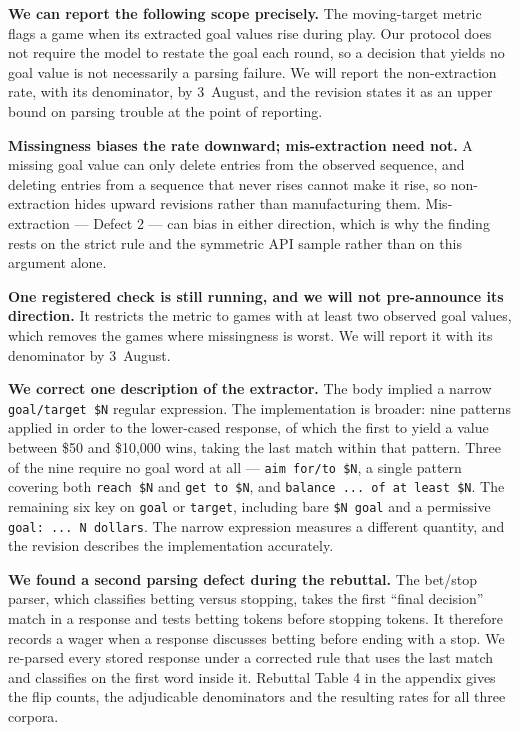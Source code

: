 \textbf{We can report the following scope precisely.} The moving-target metric flags a game when
its extracted goal values rise during play. Our protocol does not require the model to restate
the goal each round, so a decision that yields no goal value is not necessarily a parsing
failure. We will report the non-extraction rate, with its denominator, by 3~August, and the
revision states it as an upper bound on parsing trouble at the point of reporting.

\textbf{Missingness biases the rate downward; mis-extraction need not.} A missing goal value can
only delete entries from the observed sequence, and deleting entries from a sequence that never
rises cannot make it rise, so non-extraction hides upward revisions rather than manufacturing
them. Mis-extraction --- Defect 2 --- can bias in either direction, which is why the finding
rests on the strict rule and the symmetric API sample rather than on this argument alone.

\textbf{One registered check is still running, and we will not pre-announce its direction.} It
restricts the metric to games with at least two observed goal values, which removes the games
where missingness is worst. We will report it with its denominator by 3~August.

\textbf{We correct one description of the extractor.} The body implied a narrow
\texttt{goal/target \$N} regular expression. The implementation is broader: nine patterns applied
in order to the lower-cased response, of which the first to yield a value between \$50 and
\$10,000 wins, taking the last match within that pattern. Three of the nine require no goal word
at all --- \texttt{aim for/to \$N}, a single pattern covering both \texttt{reach \$N} and
\texttt{get to \$N}, and \texttt{balance ... of at least \$N}. The remaining six key on
\texttt{goal} or \texttt{target}, including bare \texttt{\$N goal} and a permissive
\texttt{goal: ... N dollars}.
The narrow expression measures a different quantity, and the revision describes the implementation
accurately.

\textbf{We found a second parsing defect during the rebuttal.} The bet/stop parser, which
classifies betting versus stopping, takes the first ``final decision'' match in a response and
tests betting tokens before stopping tokens. It therefore records a wager when a response
discusses betting before ending with a stop.
We re-parsed every stored response under a corrected rule that uses the last match and classifies
on the first word inside it. Rebuttal Table 4 in the appendix gives the flip counts, the
adjudicable denominators and the resulting rates for all three corpora.


